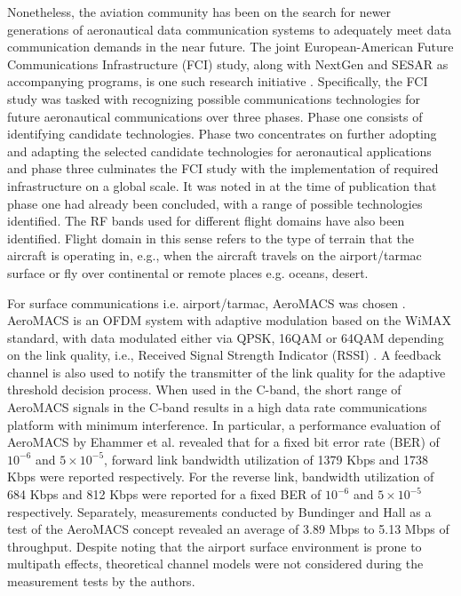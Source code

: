 Nonetheless, the aviation community has been on the search for newer generations of aeronautical data communication systems to adequately meet data communication demands in the near future. The joint European-American Future Communications Infrastructure (FCI) study, along with NextGen and SESAR as accompanying programs, is one such research initiative \cite{neji2013survey}. Specifically, the FCI study was tasked with recognizing possible communications technologies for future aeronautical communications over three phases. Phase one consists of identifying candidate technologies. Phase two concentrates on further adopting and adapting the selected candidate technologies for aeronautical applications and phase three culminates the FCI study with the implementation of required infrastructure on a global scale. It was noted in \cite{neji2013survey} at the time of publication that phase one had already been concluded, with a range of possible technologies identified. The RF bands used for different flight domains have also been identified. Flight domain in this sense refers to the type of terrain that the aircraft is operating in, e.g., when the aircraft travels on the airport/tarmac surface or fly over continental or remote places e.g. oceans, desert.

For surface communications i.e. airport/tarmac, AeroMACS was chosen \cite{neji2013survey,fistas2009future,ehammer2011aeromacs}. AeroMACS is an OFDM system with adaptive modulation based on the WiMAX standard, with data modulated either via QPSK, 16QAM or 64QAM depending on the link quality, i.e., Received Signal Strength Indicator (RSSI) \cite{budinger2011aeronautical,fistas2009future}. A feedback channel is also used to notify the transmitter of the link quality for the adaptive threshold decision process. When used in the C-band, the short range of AeroMACS signals in the C-band results in a high data rate communications platform with minimum interference. In particular, a performance evaluation of AeroMACS by Ehammer et al. \cite{ehammer2011aeromacs} revealed that for a fixed bit error rate (BER) of $10^{-6}$ and $5\times10^{-5}$, forward link bandwidth utilization of 1379 Kbps and 1738 Kbps were reported respectively. For the reverse link, bandwidth utilization of 684 Kbps and 812 Kbps were reported for a fixed BER of $10^{-6}$ and $5\times10^{-5}$ respectively. Separately, measurements conducted by Bundinger and Hall \cite{budinger2011aeronautical} as a test of the AeroMACS concept revealed an average of 3.89 Mbps to 5.13 Mbps of throughput. Despite noting that the airport surface environment is prone to multipath effects, theoretical channel models were not considered during the measurement tests by the authors.

